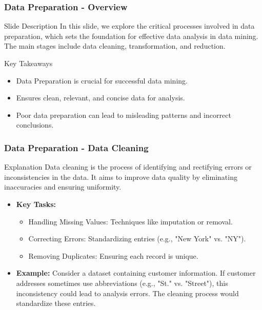 \documentclass[aspectratio=169]{beamer}
\begin{document}
\begin{frame}[fragile]
    \frametitle{Data Preparation - Overview}
    \begin{block}{Slide Description}
        In this slide, we explore the critical processes involved in data preparation, which sets the foundation for effective data analysis in data mining. The main stages include data cleaning, transformation, and reduction.
    \end{block}
    \begin{block}{Key Takeaways}
        \begin{itemize}
            \item Data Preparation is crucial for successful data mining.
            \item Ensures clean, relevant, and concise data for analysis.
            \item Poor data preparation can lead to misleading patterns and incorrect conclusions.
        \end{itemize}
    \end{block}
\end{frame}

\begin{frame}[fragile]
    \frametitle{Data Preparation - Data Cleaning}
    \begin{block}{Explanation}
        Data cleaning is the process of identifying and rectifying errors or inconsistencies in the data. It aims to improve data quality by eliminating inaccuracies and ensuring uniformity.
    \end{block}
    \begin{itemize}
        \item \textbf{Key Tasks:}
        \begin{itemize}
            \item Handling Missing Values: Techniques like imputation or removal.
            \item Correcting Errors: Standardizing entries (e.g., "New York" vs. "NY").
            \item Removing Duplicates: Ensuring each record is unique.
        \end{itemize}
        
        \item \textbf{Example:} 
        Consider a dataset containing customer information. If customer addresses sometimes use abbreviations (e.g., "St." vs. "Street"), this inconsistency could lead to analysis errors. The cleaning process would standardize these entries.
    \end{itemize}
\end{frame}
\end{document}
